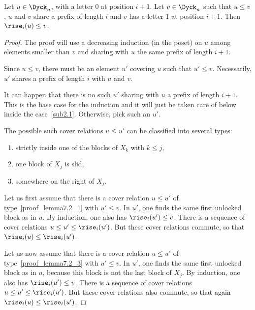 \begin{lemma}
  \label{sub_forcer_un}
  Let $u \in \Dyck_n$, with a letter $0$ at position $i+1$. Let
  $v \in \Dyck_n$ such that $u \leq v$, $u$ and $v$ share a prefix of
  length $i$ and $v$ has a letter $1$ at position $i+1$. Then
  $\rise_i(u) \leq v$.
\end{lemma}

\begin{proof}
  The proof will use a decreasing induction (in the poset) on $u$
  among elements smaller than $v$ and sharing with $u$ the same prefix
  of length $i+1$.

  Since $u \leq v$, there must be an element $u'$ covering $u$ such
  that $u' \leq v$. Necessarily, $u'$ shares a prefix of length $i$
  with $u$ and $v$.

  It can happen that there is no such $u'$ sharing with $u$ a prefix
  of length $i+1$. This is the base case for the induction and it will
  just be taken care of below inside the case~\ref{sub2.1}. Otherwise, pick
  such an $u'$.

  \smallskip

  The possible such cover relations $u \leq u'$ can be classified into several types:
  \begin{enumerate}%
  \item\label{proof_lemma7.2_1} strictly inside one of the blocks of $X_k$ with $k \leq j$,
  \item\label{proof_lemma7.2_2} one block of $X_j$ is slid,
  \item\label{proof_lemma7.2_3} somewhere on the right of $X_j$.

  \end{enumerate}

  Let us first assume that there is a cover relation $u \leq u'$ of type~\eqref{proof_lemma7.2_1}
  with $u' \leq v$. In $u'$, one finds the same first unlocked block
  as in $u$. By induction, one also has $\rise_i(u') \leq v$. There
  is a sequence of cover relations $u \leq u' \leq \rise_i(u')$. But these
  cover relations commute, so that $\rise_i(u) \leq \rise_i(u')$.

  Let us now assume that there is a cover relation $u \leq u'$ of type~\eqref{proof_lemma7.2_3} with $u' \leq v$. In $u'$, one finds the same first unlocked
  block as in $u$, because this block is not the last block of
  $X_j$. By induction, one also has $\rise_i(u') \leq v$. There is a
  sequence of cover relations $u \leq u' \leq \rise_i(u')$. But these
  cover relations also commute, so that again
  $\rise_i(u) \leq \rise_i(u')$.


\end{proof}
